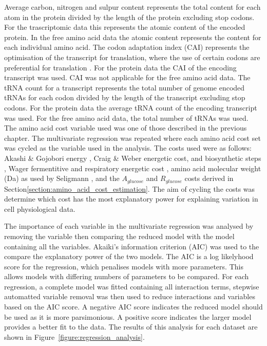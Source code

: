 Average carbon, nitrogen and sulpur content represents the total content for each atom in the protein divided by the length of the protein excluding stop codons. For the trascriptomic data this represents the atomic content of the encoded protein. In the free amino acid data the atomic content represents the content for each individual amino acid. The codon adaptation index (CAI) represents the optimisation of the transcript for translation, where the use of certain codons are preferential for translation \cite{cai}. For the protein data the CAI of the encoding transcript was used. CAI was not applicable for the free amino acid data. The tRNA count for a transcript represents the total number of genome encoded tRNAs for each codon divided by the length of the transcript excluding stop codons. For the protein data the average tRNA count of the encoding transcript was used. For the free amino acid data, the total number of tRNAs was used. The amino acid cost variable used was one of those described in the previous chapter. The multivariate regression was repeated where each amino acid cost set was cycled as the variable used in the analysis. The costs used were as follows: Akashi \& Gojobori energy \cite{akashi2002}, Craig \& Weber energetic cost, and biosynthetic steps \cite{craig1998}, Wager fermentitive and respiratory energetic cost \cite{wagner2005}, amino acid molecular weight (Da) as used by Seligmann \cite{seligmann2005}, and the $A_{glucose}$ and $R_{glucose}$ costs derived in Section\vref{section:amino_acid_cost_estimation}. The aim of cycling the costs was determine which cost has the most explanatory power for explaining variation in cell physiological data.

The importance of each variable in the multivariate regression was analysed by removing the variable then comparing the reduced model with the model containing all the variables. Akaiki's information criterion (AIC) \cite{akaiki} was used to the compare the explanatory power of the two models. The AIC is a log likelyhood score for the regression, which penalises models with more parameters. This allows models with differing numbers of parameters to be compared. For each regression, a complete model was fitted containing all interaction terms, stepwise automatted variable removal was then used to reduce interactions and variables based on the AIC score. A negative AIC score indicates the reduced model should be used as it is more parsimonious. A positive score indicates the larger model provides a better fit to the data. The results of this analysis for each dataset are shown in Figure~\vref{figure:regression_analysis}.

